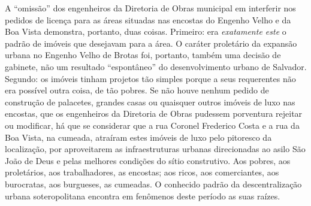A ``omissão'' dos engenheiros da Diretoria de Obras municipal em interferir nos pedidos de licença para as áreas situadas nas encostas do Engenho Velho e da Boa Vista demonstra, portanto, duas coisas. Primeiro: era \textit{exatamente este} o padrão de imóveis que desejavam para a área. O caráter proletário da expansão urbana no Engenho Velho de Brotas foi, portanto, também uma decisão de gabinete, não um resultado ``espontâneo'' do desenvolvimento urbano de Salvador. Segundo: os imóveis tinham projetos tão simples porque a seus requerentes não era possível outra coisa, de tão pobres. Se não houve nenhum pedido de construção de palacetes, grandes casas ou quaisquer outros imóveis de luxo nas encostas, que os engenheiros da Diretoria de Obras pudessem porventura rejeitar ou modificar, há que se considerar que a rua Coronel Frederico Costa e a rua da Boa Vista, na cumeada, atraíram estes imóveis de luxo pelo pitoresco da localização, por aproveitarem as infraestruturas urbanas direcionadas ao asilo São João de Deus e pelas melhores condições do sítio construtivo. Aos pobres, aos proletários, aos trabalhadores, as encostas; aos ricos, aos comerciantes, aos burocratas, aos burgueses, as cumeadas. O conhecido padrão da descentralização urbana soteropolitana encontra em fenômenos deste período as suas raízes.


